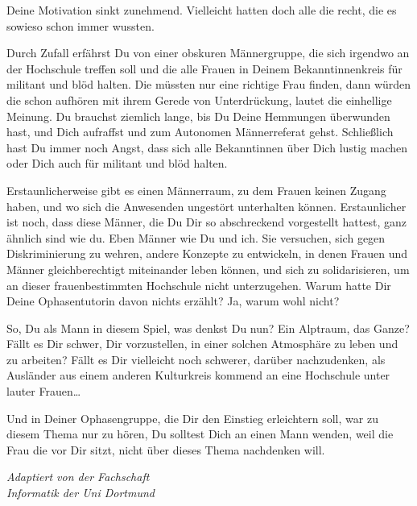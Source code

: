 {    Deine Motivation sinkt zunehmend. Vielleicht hatten doch alle die recht, die es sowieso schon immer wussten.

    Durch Zufall erfährst Du von einer obskuren Männergruppe, die sich irgendwo an der Hochschule treffen soll und die alle Frauen in Deinem Bekanntinnenkreis für militant und blöd halten. Die müssten nur eine richtige Frau finden, dann würden die schon aufhören mit ihrem Gerede von Unterdrückung, lautet die einhellige Meinung. Du brauchst ziemlich lange, bis Du Deine Hemmungen überwunden hast, und Dich aufraffst und zum Autonomen Männerreferat gehst. Schließlich hast Du immer noch Angst, dass sich alle Bekanntinnen über Dich lustig machen oder Dich auch für militant und blöd halten.

    Erstaunlicherweise gibt es einen Männer\-raum, zu dem Frauen keinen Zugang haben, und wo sich die Anwesenden ungestört unterhalten können. Erstaunlicher ist noch, dass diese Männer, die Du Dir so abschreckend vorgestellt hattest, ganz ähnlich sind wie du. Eben Männer wie Du und ich. Sie versuchen, sich gegen Diskriminierung zu wehren, andere Konzepte zu entwickeln, in denen Frauen und Männer gleichberechtigt miteinander leben können, und sich zu solidarisieren, um an dieser frauenbestimmten Hochschule nicht unterzugehen. Warum hatte Dir Deine Ophasentutorin davon nichts erzählt? Ja, warum wohl nicht?

    So, Du als Mann in diesem Spiel, was denkst Du nun? Ein Alptraum, das Ganze? Fällt es Dir schwer, Dir vorzustellen, in einer solchen Atmosphäre zu leben und zu arbeiten? Fällt es Dir vielleicht noch schwerer, darüber nachzudenken, als Ausländer aus einem anderen Kulturkreis kommend an eine Hochschule unter lauter Frauen…

    Und in Deiner Ophasengruppe, die Dir den Einstieg erleichtern soll, war zu diesem Thema nur zu hören, Du solltest Dich an einen Mann wenden, weil die Frau die vor Dir sitzt, nicht über dieses Thema nachdenken will.

}{\textit{Adaptiert von der Fachschaft\\
        Informatik der Uni Dortmund}}
